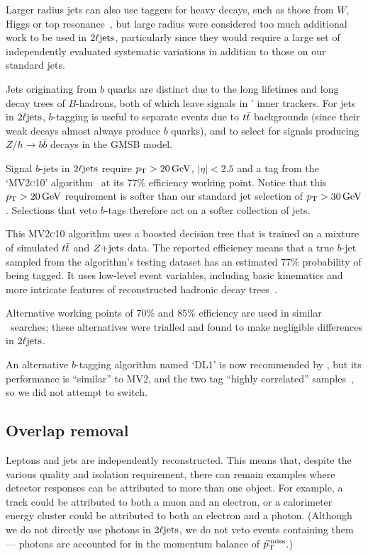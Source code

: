 Larger radius jets can also use taggers for heavy decays, such as those from
$W$, Higgs or top resonance~\cite{JETM-2018-06}, but large radius were
considered too much additional work to be used in $\twoljets$,
particularly since they would require a large set of independently evaluated
systematic variations in addition to those on our standard jets.

Jets originating from $b$ quarks are distinct due to the long lifetimes and
long decay trees of $B$-hadrons, both of which leave signals in \atlas'
inner trackers.
For jets in $\twoljets$, $b$-tagging is useful to separate events due to
$\ttbar$ backgrounds (since their weak decays almost always produce $b$
quarks), and to select for signals producing $Z/h \to b\bar b$ decays
in the GMSB model.

Signal $b$-jets in $\twoljets$ require $\pt > 20\,\eV[G]$, $|\eta| < 2.5$ and a
tag from the `\textsc{MV2c10}' algorithm~\cite{
friedman2002stochastic,
atlas_jet_mv2c10_2017,
atlas_jet_tagging_2019
} at its $77\%$ efficiency working point.
Notice that this $\pt > 20\,\eV[G]$ requirement is softer than our standard jet
selection of $\pt > 30\,\eV[G]$. Selections that veto $b$-tags therefore act on
a softer collection of jets.

This \textsc{MV2c10} algorithm uses a boosted decision tree that is trained on
a mixture of simulated $\ttbar$ and $\zjets$ data.
The reported efficiency means that a true $b$-jet sampled from the
algorithm's testing dataset has an estimated $77\%$ probability of being
tagged.
It uses low-level event variables, including basic kinematics and more intricate
features of reconstructed hadronic decay
trees~\cite{atlas_jet_mv2c10_2017, atlas_twiki_mv2}.

Alternative working points of $70\%$ and $85\%$ efficiency are used in similar
\atlas\ searches;
these alternatives were trialled and found to make negligible differences in
$\twoljets$.

An alternative $b$-tagging algorithm named `DL1' is now recommended by \atlas,
but its performance is ``similar'' to MV2, and the two tag
``highly correlated'' samples~\cite{atlas_jet_tagging_2019}, so we did not
attempt to switch.


\subsection{Overlap removal}
\label{sec:2ljets_overlap_removal}
Leptons and jets are independently reconstructed.
This means that, despite the various quality and isolation requirement, there
can remain examples where detector responses can be attributed to more than
one object.
For example, a track could be attributed to both a muon and an electron,
or a calorimeter energy cluster could be attributed to both an electron and a
photon. (Although we do not directly use photons in $\twoljets$, we do not veto
events containing them --- photons are accounted for in the momentum balance
of $\ptmiss$.)

